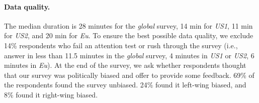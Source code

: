 \documentclass[12pt,english]{article}
\begin{document}
\begin{bibunit}
\begin{small}
\paragraph{\small Data quality.} %
The median duration is 28 minutes for the \textit{global} survey, 14 min for \textit{US1}, 11 min for \textit{US2}, and 20 min for \textit{Eu}. To ensure the best possible data quality, we exclude 14\% respondents who fail an attention test or rush through the survey (i.e., answer in less than 11.5 minutes in the \textit{global} survey, 4 minutes in \textit{US1} or \textit{US2}, 6 minutes in \textit{Eu}). %
At the end of the survey, we ask whether respondents thought that our survey was politically biased and offer to provide some feedback. 69\% of the respondents found the survey unbiased. 24\% found it left-wing biased, and 8\% found it right-wing biased.




\end{small}
\end{bibunit}
\end{document}
